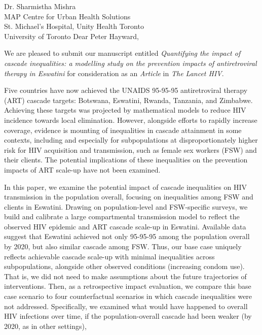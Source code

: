 \address{
  Peter Hayward\\
  Editor-in-Chief\\
  The Lancet HIV
}{Dr. Sharmistha Mishra\\
  MAP Centre for Urban Health Solutions\\
  St. Michael's Hospital, Unity Health Toronto\\
  University of Toronto}
Dear Peter Hayward,
\par
We are pleased to submit our manuscript entitled
\emph{Quantifying the impact of cascade inequalities:
  a modelling study on the prevention impacts of antiretroviral therapy in Eswatini}
for consideration as an \emph{Article} in \emph{The Lancet HIV}.
\par
Five countries have now achieved
the UNAIDS 95-95-95 antiretroviral therapy (ART) cascade targets:
Botswana, Eswatini, Rwanda, Tanzania, and Zimbabwe.
Achieving these targets was projected by
mathematical models to reduce HIV incidence towards local elimination.
However, alongside efforts to rapidly increase coverage,
evidence is mounting of inequalities in cascade attainment in some contexts,
including and especially for subpopulations
at disproportionately higher risk for HIV acquisition and transmission,
such as female sex workers (FSW) and their clients.
The potential implications of these inequalities on
the prevention impacts of ART scale-up have not been examined.
\par
In this paper, we examine the potential impact of
cascade inequalities on HIV transmission in the population overall,
focusing on inequalities among FSW and clients in Eswatini.
Drawing on population-level and FSW-specific surveys,
we build and calibrate a large compartmental transmission model
to reflect the observed HIV epidemic and ART cascade scale-up in Eswatini.
Available data suggest that Eswatini achieved not only
95-95-95 among the population overall by 2020, but also similar cascade among FSW.
Thus, our base case uniquely reflects achievable cascade scale-up
with minimal inequalities across subpopulations,
alongside other observed conditions (\eg increasing condom use).
That is, we did not need to make assumptions about
the future trajectories of interventions.
Then, as a retrospective impact evaluation, we compare
this base case scenario to four counterfactual scenarios in which
cascade inequalities were not addressed.
Specifically, we examined what would have happened to overall HIV infections over time,
if the population-overall cascade had been weaker (\casmd by 2020, as in other settings),
